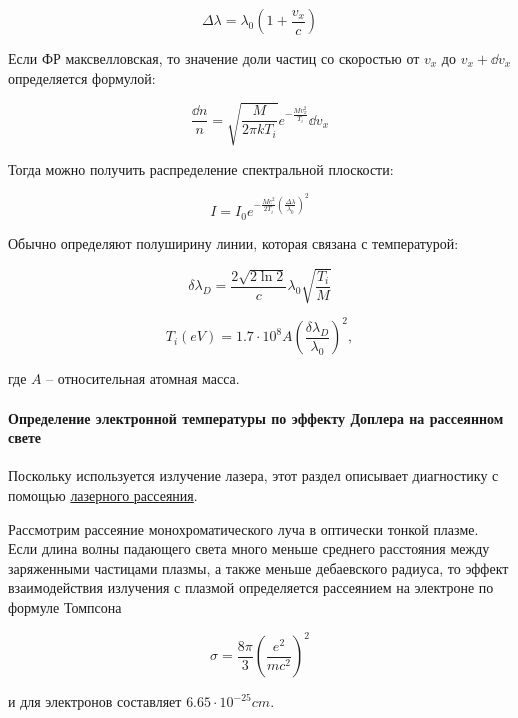 \documentclass[10pt, a4paper]{article}
\begin{document}
\begin{equation*}
	\Delta \lambda = \lambda_0 \left(1+\frac{v_x}{c}\right)
\end{equation*}

Если ФР максвелловская, то значение доли частиц со скоростью от $v_x$ до $v_x + \dd{v_x}$ определяется формулой:

\begin{equation*}
	\frac{\dd{n}}{n}=\sqrt{\frac{M}{2\pi kT_i}} e^{-\frac{Mv_x^2}{T_i}} \dd{v_x}
\end{equation*}

Тогда можно получить распределение спектральной плоскости:

\begin{equation*}
	I=I_0 e^{-\frac{Mc^2}{2T_i}\left(\frac{\Delta \lambda}{\lambda_0}\right)^2}
\end{equation*}

Обычно определяют полуширину линии, которая связана с температурой:

\begin{equation*}
	\delta \lambda_D=\frac{2 \sqrt{2\ln{2}}}{c} \lambda_0 \sqrt{\frac{T_i}{M}}
\end{equation*}


\begin{equation}
	T_i(eV)=1.7\cdot10^8A\left(\frac{\delta \lambda_D}{\lambda_0}\right)^2,
\end{equation}

где $A$ -- относительная атомная масса.

\paragraph{Определение электронной температуры по эффекту Доплера на рассеянном свете}

Поскольку используется излучение лазера, этот раздел описывает диагностику с помощью \uline{лазерного рассеяния}.

Рассмотрим рассеяние монохроматического луча в оптически тонкой плазме. Если длина волны падающего света много меньше среднего расстояния между заряженными частицами плазмы, а также меньше дебаевского радиуса, то эффект взаимодействия излучения с плазмой определяется рассеянием на электроне по формуле Томпсона

\begin{equation*}
	\sigma =\frac{8\pi}{3} \left(\frac{e^2}{mc^2}\right)^2
\end{equation*}

и для электронов составляет $6.65\cdot10^{-25} cm$.
\end{document}
